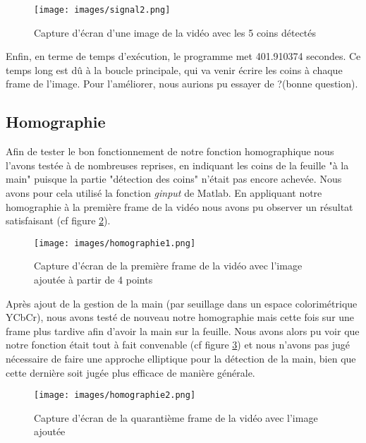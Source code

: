 \documentclass[blue]{ceri/sty/rapport}
\begin{document}
\begin{figure}[H]
\centering
\texttt{[image: images/signal2.png]}
\caption[coin2]{Capture d'écran d'une image de la vidéo avec les 5 coins détectés}
\label{fig:coin2}
\end{figure}

Enfin, en terme de temps d'exécution, le programme met 401.910374 secondes. Ce temps long est dû à la boucle principale, qui va venir écrire les coins à chaque frame de l'image. Pour l'améliorer, nous aurions pu essayer de ?(bonne question).

\subsection{Homographie}

Afin de tester le bon fonctionnement de notre fonction homographique nous l'avons testée à de nombreuses reprises, en indiquant les coins de la feuille "à la main" puisque la partie "détection des coins" n'était pas encore achevée. Nous avons pour cela utilisé la fonction \textit{ginput} de Matlab. En appliquant notre homographie à la première frame de la vidéo nous avons pu observer un résultat satisfaisant (cf figure \ref{fig:homographie1}).

\begin{figure}[H]
\centering
\texttt{[image: images/homographie1.png]}
\caption[homographie1]{Capture d'écran de la première frame de la vidéo avec l'image ajoutée à partir de 4 points}
\label{fig:homographie1}
\end{figure}

Après ajout de la gestion de la main (par seuillage dans un espace colorimétrique YCbCr), nous avons testé de nouveau notre homographie mais cette fois sur une frame plus tardive afin d'avoir la main sur la feuille. Nous avons alors pu voir que notre fonction était tout à fait convenable (cf figure \ref{fig:homographie2}) et nous n'avons pas jugé nécessaire de faire une approche elliptique pour la détection de la main, bien que cette dernière soit jugée plus efficace de manière générale.

\begin{figure}[H]
\centering
\texttt{[image: images/homographie2.png]}
\caption[homographie2]{Capture d'écran de la quarantième frame de la vidéo avec l'image ajoutée}
\label{fig:homographie2}
\end{figure}
\end{document}
